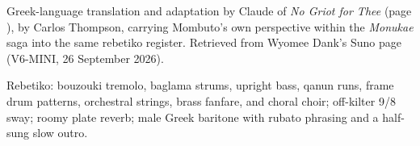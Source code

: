 
\label{sec:mobouti-aman}
\begin{notes}
Greek-language translation and adaptation by Claude of \emph{No Griot for Thee} (page \pageref{sec:no-griot-for-thee}), by Carlos Thompson, carrying Mombuto's own perspective within the \emph{Monukae} saga into the same rebetiko register. Retrieved from Wyomee Dank's Suno page (V6-MINI, 26 September 2026).
\end{notes}
\begin{style}
Rebetiko: bouzouki tremolo, baglama strums, upright bass, qanun runs, frame drum patterns, orchestral strings, brass fanfare, and choral choir; off-kilter 9/8 sway; roomy plate reverb; male Greek baritone with rubato phrasing and a half-sung slow outro.
\end{style}
